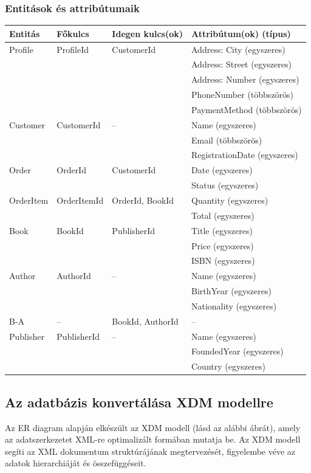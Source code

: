 \documentclass{article}
\begin{document}
    \subsubsection*{Entitások és attribútumaik}
  \begin{center}
  \begin{tabular}{|l|l|l|l|}
  \hline
  	\textbf{Entitás} & \textbf{Főkulcs} & \textbf{Idegen kulcs(ok)} & \textbf{Attribútum(ok) (típus)} \\
  \hline
  Profile & ProfileId & CustomerId & Address: City (egyszeres) \\
   &  &  & Address: Street (egyszeres) \\
   &  &  & Address: Number (egyszeres) \\
   &  &  & PhoneNumber (többszörös) \\
   &  &  & PaymentMethod (többszörös) \\
  \hline
  Customer & CustomerId & -- & Name (egyszeres) \\
   &  &  & Email (többszörös) \\
   &  &  & RegistrationDate (egyszeres) \\
  \hline
  Order & OrderId & CustomerId & Date (egyszeres) \\
   &  &  & Status (egyszeres) \\
  \hline
  OrderItem & OrderItemId & OrderId, BookId & Quantity (egyszeres) \\
   &  &  & Total (egyszeres) \\
  \hline
  Book & BookId & PublisherId & Title (egyszeres) \\
   &  &  & Price (egyszeres) \\
   &  &  & ISBN (egyszeres) \\
  \hline
  Author & AuthorId & -- & Name (egyszeres) \\
   &  &  & BirthYear (egyszeres) \\
   &  &  & Nationality (egyszeres) \\
  \hline
  B-A & -- & BookId, AuthorId & -- \\
  \hline
  Publisher & PublisherId & -- & Name (egyszeres) \\
   &  &  & FoundedYear (egyszeres) \\
   &  &  & Country (egyszeres) \\
  \hline
  \end{tabular}
  \end{center}

  \subsection{Az adatbázis konvertálása XDM modellre}
    Az ER diagram alapján elkészült az XDM modell (lásd az alábbi ábrát), amely az adatszerkezetet XML-re optimalizált formában mutatja be. Az XDM modell segíti az XML dokumentum struktúrájának megtervezését, figyelembe véve az adatok hierarchiáját és összefüggéseit.
\end{document}
